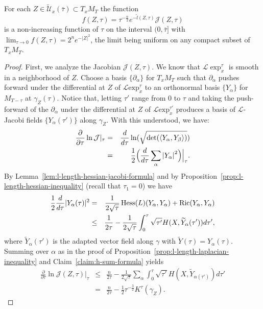 \begin{proposition}\label{prop:reduced-volume-integrand-monotone}
\label{fmonotone}

For each $Z\in \widetilde
{\mathcal U}_x(\bar\tau)\subset T_xM_T$ the function
$$f(Z,\tau)=\tau^{-\frac{n}{2}}e^{-\tilde l(Z,\tau)}{\mathcal J}(Z,\tau)$$
is a non-increasing function of $\tau$ on the interval
$(0,\bar\tau]$ with $\lim_{\tau\rightarrow
0}f(Z,\tau)=2^ne^{-|Z|^2}$, the limit being uniform on any compact
subset of $T_xM_T$.
\end{proposition}




\begin{proof}
\sketch
 First, we analyze the Jacobian
${\mathcal J}(Z,\tau)$. We know that $\mathcal{L}\exp_x^{\tau}$
is smooth in a neighborhood of $Z$. Choose a basis
$\{\partial_\alpha\}$ for $T_xM_T$ such that $\partial_\alpha$
pushes forward under the differential at $Z$ of ${\mathcal L}\mathrm{exp}_x^\tau$  to an orthonormal basis $\{Y_\alpha\}$ for
$M_{T-\tau}$ at $\gamma_Z(\tau)$. Notice that, letting $\tau'$ range
from $0$ to $\tau$ and taking the push-forward of the
$\partial_\alpha$ under the differential at $Z$ of ${\mathcal L}\mathrm{exp}_x^{\tau'}$ produces a basis of ${\mathcal L}$-Jacobi fields
$\{Y_\alpha(\tau')\}$ along $\gamma_Z$. With this understood, we
have:
\begin{eqnarray*}
\frac{\partial}{\partial \tau}\ln\mathcal{J}|_\tau & = &
\frac{d}{d\tau}\ln(\sqrt{\det(\langle
Y_{\alpha},Y_{\beta}\rangle
)})\\
 & = &
\frac{1}{2}\Bigl(\frac{d}{d\tau}\sum_{\alpha}\left\vert Y_{\alpha}\right\vert^{2}\Bigr)\Bigl|_{\tau}\Bigr.
.
\end{eqnarray*}
By Lemma~\ref{lem:l-length-hessian-jacobi-formula} and by Proposition~\ref{prop:l-length-hessian-inequality} (recall that
$\tau_1=0$) we have
\begin{eqnarray}\nonumber
\frac{1}{2}\frac{d}{d\tau}|Y_\alpha(\tau)|^2 & = &
\frac{1}{2\sqrt{\tau}}\operatorname{Hess}(L)(Y_\alpha,Y_\alpha) +\operatorname{Ric}(Y_\alpha,Y_\alpha) \\ & \le &
\frac{1}{2\tau}-\frac{1}{2\sqrt{\tau}}\int_0^{\tau}\sqrt{\tau'}H(X,\widetilde
Y_\alpha(\tau'))d\tau',\label{basic}\end{eqnarray} where $\tilde
Y_\alpha(\tau')$ is the adapted vector field along $\gamma$ with
$\tilde Y(\tau)=Y_\alpha(\tau)$. Summing over $\alpha$ as in the
proof of Proposition~\ref{prop:l-length-laplacian-inequality} and Claim~\ref{claim:h-sum-formula} yields
\begin{eqnarray}
\frac{\partial}{\partial\tau}\ln\mathcal{J}(Z,\tau)|_{\tau} &
\le & \frac{n}{2\tau} -
\frac{1}{2\sqrt{\tau}}\sum_{\alpha}\int_{0}^{\tau}\sqrt{\tau'}H(X,\tilde
Y_{\alpha(\tau')})d\tau' \nonumber
\\&=  & \frac{n}{2\tau} - \frac{1}{2}\tau^{-\frac{3}{2}}K^\tau(\gamma_Z).\label{Jinequ}
\end{eqnarray}


\end{proof}
